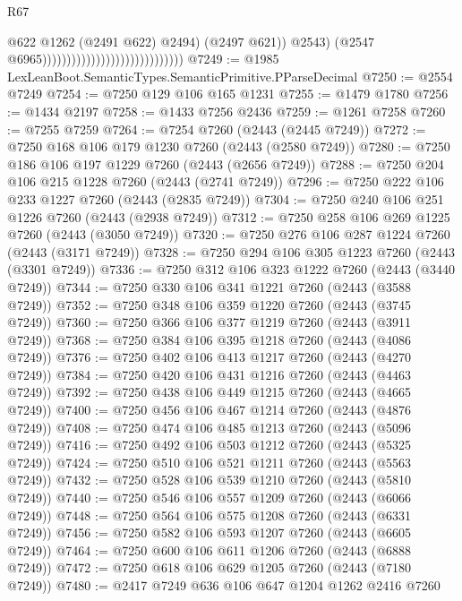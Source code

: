 \begin{lexlean}{R67}
\begin{coremodule}
                                                                  @622
                                                                  @1262
                                                                  (@2491 @622)
                                                                  @2494)
                                                                (@2497 @621))
                                                              @2543)
                                                            (@2547
                                                              @6965)))))))))))))))))))))))))))))
@7249 := @1985 LexLeanBoot.SemanticTypes.SemanticPrimitive.PParseDecimal
@7250 := @2554 @7249
@7254 := @7250 @129 @106 @165 @1231
@7255 := @1479 @1780
@7256 := @1434 @2197
@7258 := @1433 @7256 @2436
@7259 := @1261 @7258
@7260 := @7255 @7259
@7264 := @7254 @7260 (@2443 (@2445 @7249))
@7272 := @7250 @168 @106 @179 @1230 @7260 (@2443 (@2580 @7249))
@7280 := @7250 @186 @106 @197 @1229 @7260 (@2443 (@2656 @7249))
@7288 := @7250 @204 @106 @215 @1228 @7260 (@2443 (@2741 @7249))
@7296 := @7250 @222 @106 @233 @1227 @7260 (@2443 (@2835 @7249))
@7304 := @7250 @240 @106 @251 @1226 @7260 (@2443 (@2938 @7249))
@7312 := @7250 @258 @106 @269 @1225 @7260 (@2443 (@3050 @7249))
@7320 := @7250 @276 @106 @287 @1224 @7260 (@2443 (@3171 @7249))
@7328 := @7250 @294 @106 @305 @1223 @7260 (@2443 (@3301 @7249))
@7336 := @7250 @312 @106 @323 @1222 @7260 (@2443 (@3440 @7249))
@7344 := @7250 @330 @106 @341 @1221 @7260 (@2443 (@3588 @7249))
@7352 := @7250 @348 @106 @359 @1220 @7260 (@2443 (@3745 @7249))
@7360 := @7250 @366 @106 @377 @1219 @7260 (@2443 (@3911 @7249))
@7368 := @7250 @384 @106 @395 @1218 @7260 (@2443 (@4086 @7249))
@7376 := @7250 @402 @106 @413 @1217 @7260 (@2443 (@4270 @7249))
@7384 := @7250 @420 @106 @431 @1216 @7260 (@2443 (@4463 @7249))
@7392 := @7250 @438 @106 @449 @1215 @7260 (@2443 (@4665 @7249))
@7400 := @7250 @456 @106 @467 @1214 @7260 (@2443 (@4876 @7249))
@7408 := @7250 @474 @106 @485 @1213 @7260 (@2443 (@5096 @7249))
@7416 := @7250 @492 @106 @503 @1212 @7260 (@2443 (@5325 @7249))
@7424 := @7250 @510 @106 @521 @1211 @7260 (@2443 (@5563 @7249))
@7432 := @7250 @528 @106 @539 @1210 @7260 (@2443 (@5810 @7249))
@7440 := @7250 @546 @106 @557 @1209 @7260 (@2443 (@6066 @7249))
@7448 := @7250 @564 @106 @575 @1208 @7260 (@2443 (@6331 @7249))
@7456 := @7250 @582 @106 @593 @1207 @7260 (@2443 (@6605 @7249))
@7464 := @7250 @600 @106 @611 @1206 @7260 (@2443 (@6888 @7249))
@7472 := @7250 @618 @106 @629 @1205 @7260 (@2443 (@7180 @7249))
@7480 := @2417 @7249 @636 @106 @647 @1204 @1262 @2416 @7260

\end{coremodule}
\end{lexlean}
